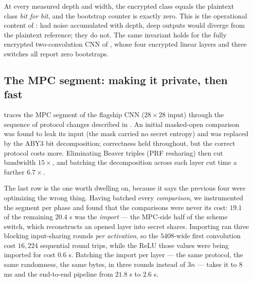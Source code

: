 \documentclass[11pt]{article}
\theoremstyle{plain}
\theoremstyle{definition}
\theoremstyle{remark}
\begin{document}
At every measured depth and width, the encrypted class equals the plaintext
class \emph{bit for bit}, and the bootstrap counter is exactly zero. This is
the operational content of : had noise accumulated with depth,
deep outputs would diverge from the plaintext reference; they do not. The
same invariant holds for the fully encrypted two-convolution CNN of
, whose four encrypted linear layers and three switches all
report zero bootstraps.

\subsection{The MPC segment: making it private, then fast}

 traces the MPC segment of the flagship CNN ($28\times28$
input) through the sequence of protocol changes described in
. An initial masked-open comparison was found to leak its input
(the mask carried no secret entropy) and was replaced by the ABY3 bit
decomposition; correctness held throughout, but the correct protocol costs
more. Eliminating Beaver triples (PRF resharing) then cut bandwidth
$15\times$, and batching the decomposition across each layer cut time a
further $6.7\times$.

The last row is the one worth dwelling on, because it says the previous four
were optimizing the wrong thing. Having batched every \emph{comparison}, we
instrumented the segment per phase and found that the comparisons were
never its cost: $19.1$ of the remaining $20.4$ s was the \emph{import} ---
the MPC-side half of the scheme switch, which reconstructs an opened layer
into secret shares. Importing ran three blocking input-sharing rounds
\emph{per activation}, so the $5408$-wide first convolution cost $16{,}224$
sequential round trips, while the ReLU those values were being imported for
cost $0.6$ s. Batching the import per layer --- the same protocol, the same
randomness, the same bytes, in three rounds instead of $3n$ --- takes it to
$8$ ms and the end-to-end pipeline from $21.8$ s to $2.6$ s.
\end{document}
